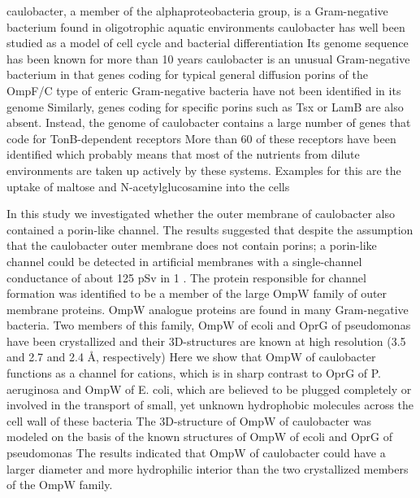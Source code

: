     \ac{caulobacter}, a member of the alphaproteobacteria group, is a Gram-negative bacterium found in oligotrophic aquatic environments \ac{caulobacter} has well been studied as a model of cell cycle and bacterial differentiation Its genome sequence has been known for more than 10 years \ac{caulobacter} is an unusual Gram-negative bacterium in that genes coding for typical general diffusion porins of the OmpF/C type of enteric Gram-negative bacteria have not been identified in its genome Similarly, genes coding for specific porins such as Tsx or LamB are also absent. Instead, the genome of \ac{caulobacter} contains a large number of genes that code for TonB-dependent receptors More than 60 of these receptors have been identified which probably means that most of the nutrients from dilute environments are taken up actively by these systems. Examples for this are the uptake of maltose and N-acetylglucosamine into the cells

    In this study we investigated whether the outer membrane of \ac{caulobacter} also contained a porin-like channel. The results suggested that despite the assumption that the \ac{caulobacter} outer membrane does not contain porins; a porin-like channel could be detected in artificial membranes with a single-channel conductance of about 125 \si{\pico\sievert} in 1 \si{\molar} . The protein responsible for channel formation was identified to be a member of the large OmpW family of outer membrane proteins. OmpW analogue proteins are found in many Gram-negative bacteria. Two members of this family, OmpW of \ac{ecoli} and OprG of \ac{pseudomonas} have been crystallized and their 3D-structures are known at high resolution (3.5 and 2.7 and 2.4 \AA, respectively) Here we show that OmpW of \ac{caulobacter} functions as a channel for cations, which is in sharp contrast to OprG of P. aeruginosa and OmpW of E. coli, which are believed to be plugged completely or involved in the transport of small, yet unknown hydrophobic molecules across the cell wall of these bacteria The 3D-structure of OmpW of \ac{caulobacter} was modeled on the basis of the known structures of OmpW of \ac{ecoli} and OprG of \ac{pseudomonas} The results indicated that OmpW of \ac{caulobacter} could have a larger diameter and more hydrophilic interior than the two crystallized members of the OmpW family.

